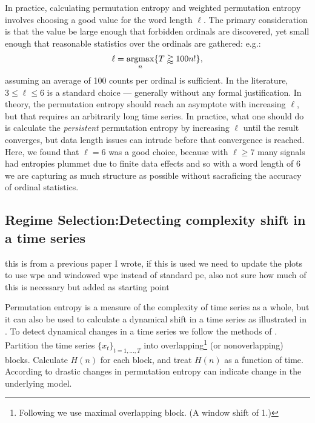 In practice, calculating permutation entropy and weighted permutation entropy involves choosing a good value for the word length $\ell$. The primary consideration is that the value be large enough that forbidden ordinals are discovered, yet small enough that reasonable statistics over the ordinals are gathered: e.g.:
\begin{align*}
  \ell = \operatornamewithlimits{argmax}_n \{ T \gtrapprox 100 n! \},
\end{align*}
assuming an average of 100 counts per ordinal is sufficient. In the literature, $3 \le \ell \le 6$ is a standard choice --- generally without any formal justification. In theory, the permutation entropy should reach an asymptote with increasing $\ell$, but that requires an arbitrarily long time series. In practice, what one should do is calculate the \emph{persistent} permutation entropy by increasing $\ell$ until the result converges, but data length issues can intrude before that convergence is reached. Here, we found that $\ell = 6$ was a good choice, because with $\ell \geq 7$ many signals had entropies plummet due to finite data effects and so with a word length of 6 we are capturing as much structure as possible without sacraficing the accuracy of ordinal statistics.

\subsection{Regime Selection:Detecting complexity shift in a time series}\label{sec:wpeRegime}

{\color{red} this is from a previous paper I wrote, if this is used we need to update the plots to use wpe and windowed wpe instead of standard pe, also not sure how much of this is necessary but added as starting point}

Permutation entropy is a measure of the complexity of time series as a whole, but it can also be used to calculate a dynamical shift in a time series as illustrated in \cite{cao2004det}. To detect dynamical changes in a time series we follow the methods of \cite{cao2004det}. Partition the time series  $\{x_t\}_{t = 1,\dots,T}$ into overlapping\footnote{Following \cite{cao2004det} we use maximal overlapping block. (A window shift of 1.)} (or nonoverlapping) blocks. Calculate $H(n)$ for each block, and treat $H(n)$ as a function of time.  According to \cite{cao2004det} drastic changes in permutation entropy can indicate change in the underlying model.

